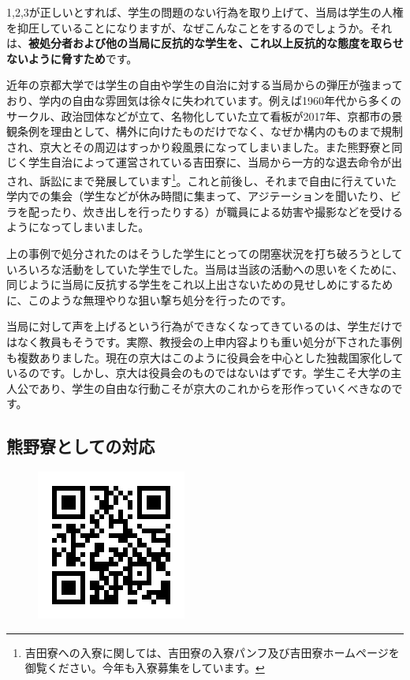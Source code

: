 \vspace{4mm}
\noindent{}

1,2,3が正しいとすれば、学生の問題のない行為を取り上げて、当局は学生の人権を抑圧していることになりますが、なぜこんなことをするのでしょうか。それは、\textbf{被処分者および他の当局に反抗的な学生を、これ以上反抗的な態度を取らせないように脅すため}です。

近年の京都大学では学生の自由や学生の自治に対する当局からの弾圧が強まっており、学内の自由な雰囲気は徐々に失われています。例えば1960年代から多くのサークル、政治団体などが立て、名物化していた立て看板が2017年、京都市の景観条例を理由として、構外に向けたものだけでなく、なぜか構内のものまで規制され、京大とその周辺はすっかり殺風景になってしまいました。また熊野寮と同じく学生自治によって運営されている吉田寮に、当局から一方的な退去命令が出され、訴訟にまで発展しています\footnote{吉田寮への入寮に関しては、吉田寮の入寮パンフ及び吉田寮ホームページを御覧ください。今年も入寮募集をしています。}。これと前後し、それまで自由に行えていた学内での集会（学生などが休み時間に集まって、アジテーションを聞いたり、ビラを配ったり、炊き出しを行ったりする）が職員による妨害や撮影などを受けるようになってしまいました。

上の事例で処分されたのはそうした学生にとっての閉塞状況を打ち破ろうとしていろいろな活動をしていた学生でした。当局は当該の活動への思いをくために、同じように当局に反抗する学生をこれ以上出さないための見せしめにするために、このような無理やりな狙い撃ち処分を行ったのです。

当局に対して声を上げるという行為ができなくなってきているのは、学生だけではなく教員もそうです。実際、教授会の上申内容よりも重い処分が下された事例も複数ありました。現在の京大はこのように役員会を中心とした独裁国家化しているのです。しかし、京大は役員会のものではないはずです。学生こそ大学の主人公であり、学生の自由な行動こそが京大のこれからを形作っていくべきなのです。


\subsection{熊野寮としての対応}

\begin{figure}
    \vspace*{-8mm}
    \includegraphics[width=8zw]{gazo/zenshotaishomei.png}
\end{figure}

